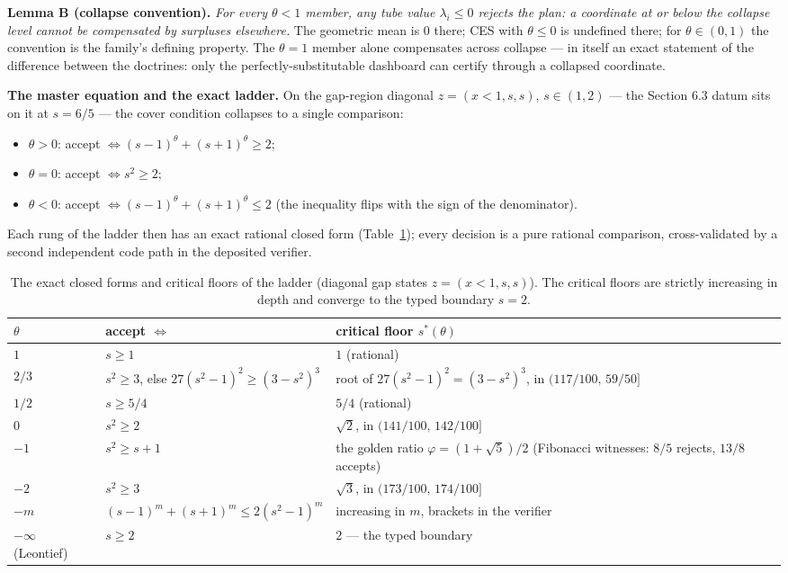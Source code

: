 \documentclass[3p,11pt]{elsarticle}
\providecommand{\tightlist}{\setlength{\itemsep}{0pt}\setlength{\parskip}{0pt}}
\begin{document}
\textbf{Lemma B (collapse convention).} \emph{For every \(\theta < 1\)
member, any tube value \(\lambda_i \le 0\) rejects the plan: a
coordinate at or below the collapse level cannot be compensated by
surpluses elsewhere.} The geometric mean is \(0\) there; CES with
\(\theta \le 0\) is undefined there; for \(\theta \in (0,1)\) the
convention is the family's defining property. The \(\theta = 1\) member
alone compensates across collapse --- in itself an exact statement of the
difference between the doctrines: only the perfectly-substitutable
dashboard can certify through a collapsed coordinate.

\textbf{The master equation and the exact ladder.} On the gap-region
diagonal \(z = (x < 1, s, s)\), \(s \in (1, 2)\) --- the Section 6.3
datum sits on it at \(s = 6/5\) --- the cover condition collapses to a
single comparison:

\begin{itemize}
\tightlist
\item
  \(\theta > 0\): accept \(\iff (s-1)^\theta + (s+1)^\theta \ge 2\);
\item
  \(\theta = 0\): accept \(\iff s^2 \ge 2\);
\item
  \(\theta < 0\): accept \(\iff (s-1)^\theta + (s+1)^\theta \le 2\)
  (the inequality flips with the sign of the denominator).
\end{itemize}

Each rung of the ladder then has an exact rational closed form
(Table~\ref{tab:sigmaladder}); every decision is a pure rational
comparison, cross-validated by a second independent code path in the
deposited verifier.

\begin{table}[htbp]
\centering
\small
\caption{The exact closed forms and critical floors of the ladder
(diagonal gap states \(z = (x < 1, s, s)\)). The critical floors are
strictly increasing in depth and converge to the typed boundary \(s = 2\).}
\label{tab:sigmaladder}
\begin{tabular}{@{}lp{4.6cm}p{4.9cm}@{}}
\toprule
\(\theta\) & accept \(\iff\) & critical floor \(s^*(\theta)\) \\
\midrule
\(1\) & \(s \ge 1\) & \(1\) (rational) \\
\(2/3\) & \(s^2 \ge 3\), else \(27(s^2-1)^2 \ge (3-s^2)^3\) & root of \(27(s^2-1)^2 = (3-s^2)^3\), in \((117/100,\, 59/50]\) \\
\(1/2\) & \(s \ge 5/4\) & \(5/4\) (rational) \\
\(0\) & \(s^2 \ge 2\) & \(\sqrt{2}\), in \((141/100,\, 142/100]\) \\
\(-1\) & \(s^2 \ge s + 1\) & the golden ratio \(\varphi = (1+\sqrt{5})/2\) (Fibonacci witnesses: \(8/5\) rejects, \(13/8\) accepts) \\
\(-2\) & \(s^2 \ge 3\) & \(\sqrt{3}\), in \((173/100,\, 174/100]\) \\
\(-m\) & \((s-1)^m + (s+1)^m \le 2(s^2-1)^m\) & increasing in \(m\), brackets in the verifier \\
\(-\infty\) (Leontief) & \(s \ge 2\) & \(2\) --- the typed boundary \\
\bottomrule
\end{tabular}
\end{table}
\end{document}
